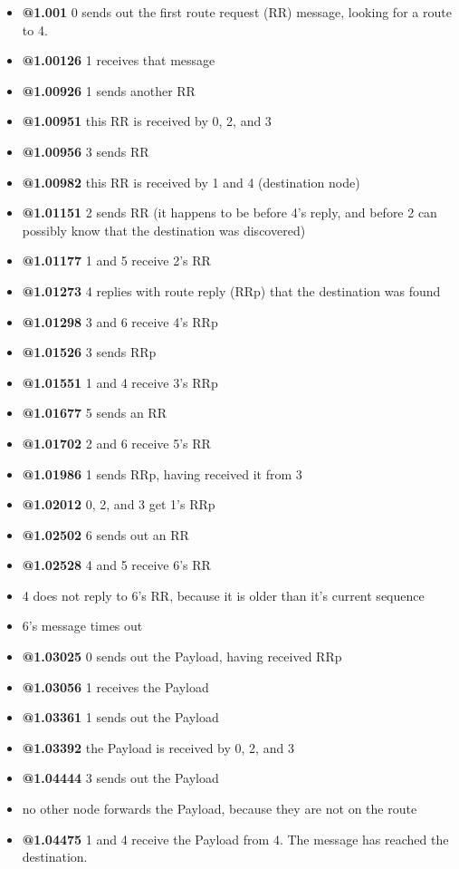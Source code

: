 \documentclass[11pt,journal]{article}
\begin{document}
	\begin{itemize}
		\item \textbf{@1.001} 0 sends out the first route request (RR) message, looking for a route to 4.
		\item \textbf{@1.00126} 1 receives that message
		\item \textbf{@1.00926} 1 sends another RR
		\item \textbf{@1.00951} this RR is received by 0, 2, and 3
		\item \textbf{@1.00956} 3 sends RR
		\item \textbf{@1.00982} this RR is received by 1 and 4 (destination node)
		\item \textbf{@1.01151} 2 sends RR (it happens to be before 4's reply, and before 2 can possibly know that the destination was discovered)
		\item \textbf{@1.01177} 1 and 5 receive 2's RR
		
		\item \textbf{@1.01273} 4 replies with route reply (RRp) that the destination was found
		\item \textbf{@1.01298} 3 and 6 receive 4's RRp
		\item \textbf{@1.01526} 3 sends RRp
		\item \textbf{@1.01551} 1 and 4 receive 3's RRp
		\item \textbf{@1.01677} 5 sends an RR
		\item \textbf{@1.01702} 2 and 6 receive 5's RR
		\item \textbf{@1.01986} 1 sends RRp, having received it from 3
		\item \textbf{@1.02012} 0, 2, and 3 get 1's RRp
		\item \textbf{@1.02502} 6 sends out an RR
		\item \textbf{@1.02528} 4 and 5 receive 6's RR
		\item 4 does not reply to 6's RR, because it is older than it's current sequence
		\item 6's message times out
		\item \textbf{@1.03025} 0 sends out the Payload, having received RRp
		\item \textbf{@1.03056} 1 receives the Payload
		\item \textbf{@1.03361} 1 sends out the Payload
		\item \textbf{@1.03392} the Payload is received by 0, 2, and 3
		\item \textbf{@1.04444} 3 sends out the Payload
		\item no other node forwards the Payload, because they are not on the route
		\item \textbf{@1.04475} 1 and 4 receive the Payload from 4. The message has reached the destination.
		
	\end{itemize}
\end{document}
